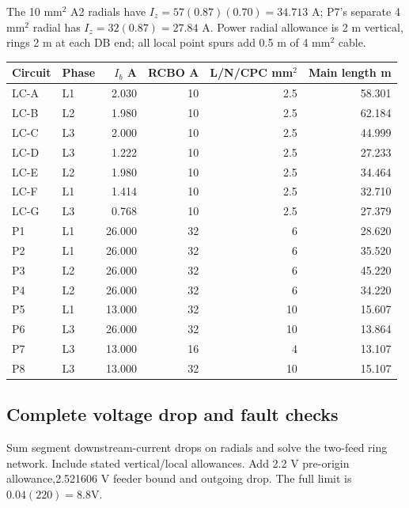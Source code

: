 The 10 mm$^2$ A2 radials have $I_z=57(0.87)(0.70)=34.713$ A;  P7's separate 4 mm$^2$ radial has $I_z=32(0.87)=27.84$ A. Power radial allowance is 2 m vertical, rings 2 m at each DB end;  all local point spurs add 0.5 m of 4 mm$^2$ cable.
\begin{longtable}{llrrrr}\toprule
Circuit & Phase & $I_b$ A & RCBO A & L/N/CPC mm$^2$ & Main length m\\\midrule\endhead

LC-A & L1 & 2.030 & 10 & 2.5 & 58.301 \\
LC-B & L2 & 1.980 & 10 & 2.5 & 62.184 \\
LC-C & L3 & 2.000 & 10 & 2.5 & 44.999 \\
LC-D & L3 & 1.222 & 10 & 2.5 & 27.233 \\
LC-E & L2 & 1.980 & 10 & 2.5 & 34.464 \\
LC-F & L1 & 1.414 & 10 & 2.5 & 32.710 \\
LC-G & L3 & 0.768 & 10 & 2.5 & 27.379 \\
P1 & L1 & 26.000 & 32 & 6 & 28.620 \\
P2 & L1 & 26.000 & 32 & 6 & 35.520 \\
P3 & L2 & 26.000 & 32 & 6 & 45.220 \\
P4 & L2 & 26.000 & 32 & 6 & 34.220 \\
P5 & L1 & 13.000 & 32 & 10 & 15.607 \\
P6 & L3 & 26.000 & 32 & 10 & 13.864 \\
P7 & L3 & 13.000 & 16 & 4 & 13.107 \\
P8 & L3 & 13.000 & 32 & 10 & 15.107 \\

\bottomrule\end{longtable}
\subsection*{Complete voltage drop and fault checks}
Sum segment downstream-current drops on radials and solve the two-feed ring network. Include stated vertical/local allowances. Add 2.2 V pre-origin allowance,2.521606 V feeder bound and outgoing drop. The full limit is $0.04(220)=8.8$V.


